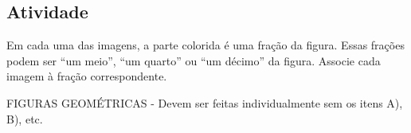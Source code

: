 \documentclass[a4,12pt]{book}
\begin{document}
\subsection{Atividade}










Em cada uma das imagens, a parte colorida é uma fração da figura. Essas frações podem ser ``um meio'', ``um quarto'' ou ``um décimo'' da figura. Associe cada imagem à fração correspondente.

\begin{imagem*}[breakable]{}{}   FIGURAS GEOMÉTRICAS - Devem ser feitas individualmente sem os itens A), B), etc.  
  
  
  
\end{imagem*}
\end{document}
